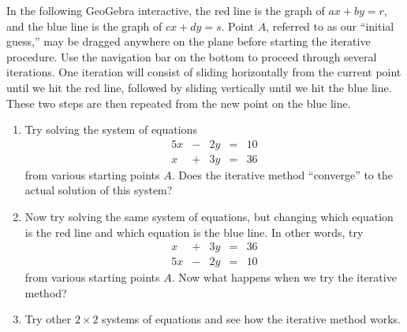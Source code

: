 \documentclass{ximera}
\begin{document}
\begin{exploration}\label{exp:gauss-seidel2x2}
In the following GeoGebra interactive, the red line is the graph of $ax+by=r$, and the blue line is the graph of $cx+dy=s$.  Point $A$, referred to as our ``initial guess,'' may be dragged anywhere on the plane before starting the iterative procedure.  Use the navigation bar on the bottom to proceed through several iterations.  One iteration will consist of sliding horizontally from the current point until we hit the red line, followed by sliding vertically until we hit the blue line.  These two steps are then repeated from the new point on the blue line.


\begin{onlineOnly}    
    \begin{center}
\end{center}
\end{onlineOnly}

    \begin{enumerate}
        \item Try solving the system of equations
\begin{equation}\label{eq:diagdom1}
\begin{array}{ccccc}
      5x& -&2y&=&10\\
      x & +&3y&= &36 
    \end{array}
\end{equation}
from various starting points $A$.  Does the iterative method ``converge'' to the actual solution of this system?
        \item Now try solving the same system of equations, but changing which equation is the red line and which equation is the blue line.  In other words, try
\begin{equation}\label{eq:diagdom2}
\begin{array}{ccccc}
      x & +&3y&= &36  \\
     5x& -&2y&=&10
    \end{array}
\end{equation}
from various starting points $A$.  Now what happens when we try the iterative method?
\item Try other $2 \times 2$ systems of equations and see how the iterative method works.
    \end{enumerate}
\end{exploration}
\end{document}
